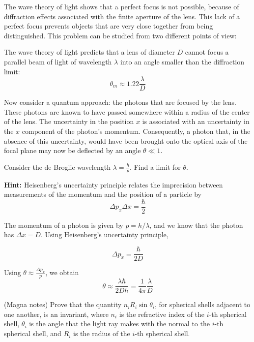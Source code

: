 \documentclass[11pt]{article}
\begin{document}
\begin{pproblem}
    The wave theory of light shows that a perfect focus is not possible, because of diffraction effects associated with the finite aperture of the lens. This lack of a perfect focus prevents objects that are very close together from being distinguished. This problem can be studied from two different points of view:

    The wave theory of light predicts that a lens of diameter $D$ cannot focus a parallel beam of light of wavelength $\lambda$ into an angle smaller than the diffraction limit:
    \begin{equation}
        \theta_m \approx 1.22 \frac{\lambda}{D}
    \end{equation}

    Now consider a quantum approach: the photons that are focused by the lens. These photons are known to have passed somewhere within a radius of the center of the lens. The uncertainty in the position $x$ is associated with an uncertainty in the $x$ component of the photon's momentum. Consequently, a photon that, in the absence of this uncertainty, would have been brought onto the optical axis of the focal plane may now be deflected by an angle $\theta \ll 1$.

    Consider the de Broglie wavelength $\lambda = \frac{h}{p}$. Find a limit for $\theta$.

    \textbf{Hint:} Heisenberg's uncertainty principle relates the imprecision between measurements of the momentum and the position of a particle by
    \[\Delta p_x \Delta x = \frac{\hbar}{2}\]

\begin{pssolution*}{}{}
    The momentum of a photon is given by \(p = h/\lambda\), and we know that the photon has \(\Delta x = D\). Using Heisenberg's uncertainty principle,

    \[\Delta p_x = \frac{\hbar}{2D}\]

    Using \(\theta \approx \frac{\Delta p_x}{p}\), we obtain
    \[\boxed{\theta \approx\frac{\lambda\hbar}{2D h} = \frac{1}{4\pi}\frac{\lambda}{D}}\]
\end{pssolution*}
\end{pproblem}

\begin{pproblem} (Magna notes)
    Prove that the quantity \(n_iR_i\sin \theta_i\), for spherical shells adjacent to one another, is an invariant, where \(n_i\) is the refractive index of the \(i\)-th spherical shell, \(\theta_i\) is the angle that the light ray makes with the normal to the \(i\)-th spherical shell, and \(R_i\) is the radius of the \(i\)-th spherical shell.
    
\end{pproblem}
\end{document}

